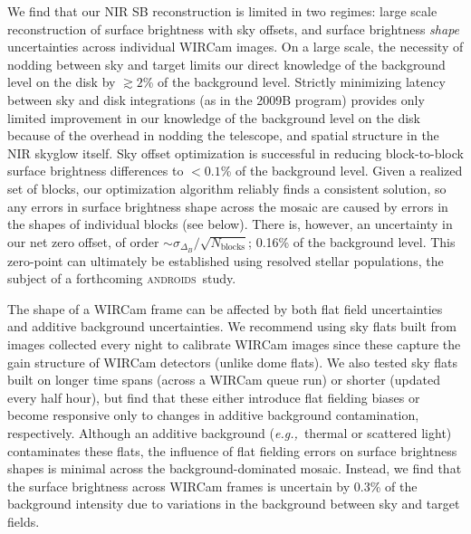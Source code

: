 \documentclass[iop]{emulateapj}
\newcommand{\eg}{\textit{e.g.,~}}
\newcommand{\androids}{\textsc{androids}}
\begin{document}
We find that our NIR SB reconstruction is limited in two regimes: large scale reconstruction of surface brightness with sky offsets, and surface brightness \emph{shape} uncertainties across individual WIRCam images.
On a large scale, the necessity of nodding between sky and target limits our direct knowledge of the background level on the disk by $\gtrsim 2$\% of the background level.
Strictly minimizing latency between sky and disk integrations (as in the 2009B program) provides only limited improvement in our knowledge of the background level on the disk because of the overhead in nodding the telescope, and spatial structure in the NIR skyglow itself.
Sky offset optimization is successful in reducing block-to-block surface brightness differences to $<0.1$\% of the background level.
Given a realized set of blocks, our optimization algorithm reliably finds a consistent solution, so any errors in surface brightness shape across the mosaic are caused by errors in the shapes of individual blocks (see below).
There is, however, an uncertainty in our net zero offset, of order $\sim \sigma_{\Delta_B} / \sqrt{N_\mathrm{blocks}}$; 0.16\% of the background level.
This zero-point can ultimately be established using resolved stellar populations, the subject of a forthcoming \androids\ study.

The shape of a WIRCam frame can be affected by both flat field uncertainties and additive background uncertainties.
We recommend using sky flats built from images collected every night to calibrate WIRCam images since these capture the gain structure of WIRCam detectors (unlike dome flats).
We also tested sky flats built on longer time spans (across a WIRCam queue run) or shorter (updated every half hour), but find that these either introduce flat fielding biases or become responsive only to changes in additive background contamination, respectively.
Although an additive background (\eg thermal or scattered light) contaminates these flats, the influence of flat fielding errors on surface brightness shapes is minimal across the background-dominated mosaic.
Instead, we find that the surface brightness across WIRCam frames is uncertain by 0.3\% of the background intensity due to variations in the background between sky and target fields.


\end{document}
